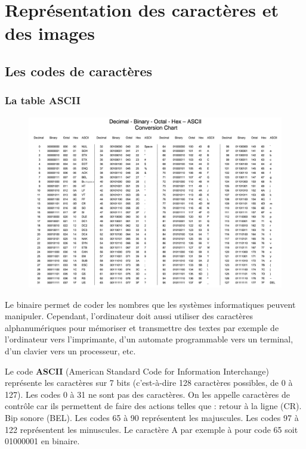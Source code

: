 \documentclass[11pt, a4paper]{book}
\begin{document}
\setcounter{chapter}{1}
\chapter{Représentation des caractères et des images}

\section{Les codes de caractères}

\subsection{La table ASCII}

\begin{center}
\begin{figure}[h!]
\centerline{\includegraphics[width=18cm]{images/ASCII2}}
\end{figure}
\end{center}

Le binaire permet de coder les nombres que les systèmes informatiques peuvent manipuler. Cependant, l'ordinateur doit aussi utiliser des caractères alphanumériques pour mémoriser et transmettre des textes par exemple de l’ordinateur vers l’imprimante, d’un automate programmable vers un terminal, d’un clavier vers un processeur, etc. 

Le code {\bf ASCII} (American Standard Code for Information Interchange) représente les caractères sur 7 bits (c'est-à-dire 128 caractères possibles, de 0 à 127). Les codes 0 à 31 ne sont pas des caractères. On les appelle caractères de contrôle car ils permettent de faire des actions telles que : retour à la ligne (CR). Bip sonore (BEL). Les codes 65 à 90 représentent les majuscules. Les codes 97 à 122 représentent les minuscules. Le caractère A par exemple à pour code 65 soit 01000001 en binaire. 
\end{document}
